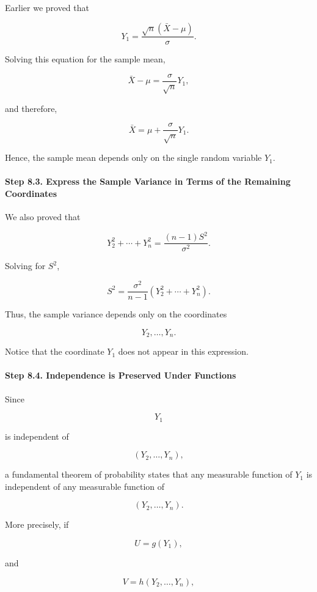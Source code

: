 \documentclass[11pt]{article}
\begin{document}
\begin{mdframed}[
		linewidth=0.8pt,
		roundcorner=6pt,
		backgroundcolor=gray!5,
		linecolor=gray!60,
		innertopmargin=10pt,
		innerbottommargin=10pt,
		innerleftmargin=10pt,
		innerrightmargin=10pt
		]
		Earlier we proved that
		
		\[
		\boxed{
			Y_1
			=
			\frac{\sqrt n(\bar X-\mu)}
			{\sigma}.
		}
		\]
		
		Solving this equation for the sample mean,
		
		\[
		\bar X-\mu
		=
		\frac{\sigma}{\sqrt n}Y_1,
		\]
		
		and therefore,
		
		\[
		\boxed{
			\bar X
			=
			\mu
			+
			\frac{\sigma}{\sqrt n}Y_1.
		}
		\]
		
		Hence, the sample mean depends only on the single random variable
		\(Y_1\).
		
		\paragraph{Step 8.3. Express the Sample Variance in Terms of the Remaining Coordinates}
		
		We also proved that
		
		\[
		Y_2^2+\cdots+Y_n^2
		=
		\frac{(n-1)S^2}{\sigma^2}.
		\]
		
		Solving for \(S^2\),
		
		\[
		\boxed{
			S^2
			=
			\frac{\sigma^2}{n-1}
			\left(
			Y_2^2+\cdots+Y_n^2
			\right).
		}
		\]
		
		Thus, the sample variance depends only on the coordinates
		
		\[
		Y_2,\ldots,Y_n.
		\]
		
		Notice that the coordinate \(Y_1\) does not appear in this expression.
		
		\paragraph{Step 8.4. Independence is Preserved Under Functions}
		
		Since
		
		\[
		Y_1
		\]
		
		is independent of
		
		\[
		(Y_2,\ldots,Y_n),
		\]
		
		a fundamental theorem of probability states that any measurable function of
		\(Y_1\) is independent of any measurable function of
		
		\[
		(Y_2,\ldots,Y_n).
		\]
		
		More precisely, if
		
		\[
		U=g(Y_1),
		\]
		
		and
		
		\[
		V=h(Y_2,\ldots,Y_n),
		\]
		

\end{mdframed}
\end{document}
